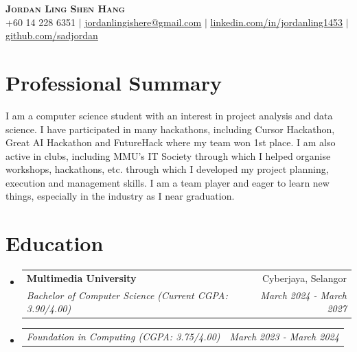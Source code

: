\documentclass[letterpaper,11pt]{article}
\makeatletter
\newcommand{\resumeSubheading}[4]{
  \vspace{-2pt}\item
    \begin{tabular*}{0.97\textwidth}[t]{l@{\extracolsep{\fill}}r}
      \textbf{#1} & #2 \\
      \textit{\small#3} & \textit{\small #4} \\
    \end{tabular*}\vspace{-7pt}
}
\newcommand{\resumeSubSubheading}[2]{
    \item
    \begin{tabular*}{0.97\textwidth}{l@{\extracolsep{\fill}}r}
      \textit{\small#1} & \textit{\small #2} \\
    \end{tabular*}\vspace{-7pt}
}
\newcommand{\resumeSubHeadingListStart}{\begin{itemize}[leftmargin=0.15in, label={}]}
\newcommand{\resumeSubHeadingListEnd}{\end{itemize}}
\makeatother
\begin{document}

\begin{center}
    \textbf{\Huge \scshape Jordan Ling Shen Hang} \\ \vspace{1pt}
    \small +60 14 228 6351 $|$ \href{jordanlingishere@gmail.com}{\underline{jordanlingishere@gmail.com}} $|$ 
    \href{https://linkedin.com/in/jordanling1453}{\underline{linkedin.com/in/jordanling1453}} $|$
    \href{https://github.com/sadjordan}{\underline{github.com/sadjordan}}
\end{center}


\section{Professional Summary}
\begin{flushleft}
\small{I am a computer science student with an interest in project analysis and data science. I have participated in many hackathons, including Cursor Hackathon, Great AI Hackathon and FutureHack where my team won 1st place. I am also active in clubs, including MMU’s IT Society through which I helped organise workshops, hackathons, etc. through which I developed my project planning, execution and management skills. I am a team player and eager to learn new things, especially in the industry as I near graduation.}
\end{flushleft}


\section{Education}
  \resumeSubHeadingListStart
    \resumeSubheading
      {Multimedia University}{Cyberjaya, Selangor}
      {Bachelor of Computer Science (Current CGPA: 3.90/4.00)}{March 2024 - March 2027}
    \resumeSubSubheading
      {Foundation in Computing (CGPA: 3.75/4.00)}{March 2023 - March 2024}
  \resumeSubHeadingListEnd
\end{document}
